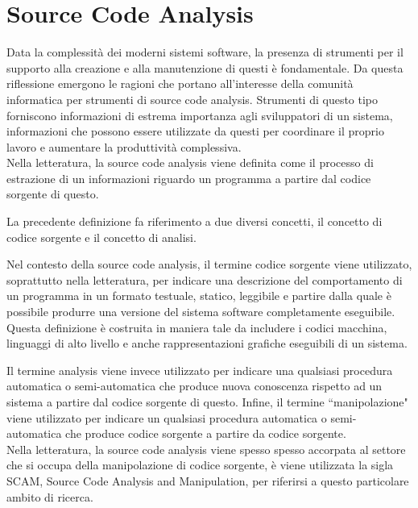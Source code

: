 \section{Source Code Analysis}
\label{source-code-analysis}

Data la complessità dei moderni sistemi software, la presenza di strumenti per
il supporto alla creazione e alla manutenzione di questi è fondamentale. Da
questa riflessione emergono le ragioni che portano all’interesse della comunità
informatica per strumenti di source code analysis. Strumenti di questo tipo
forniscono informazioni di estrema importanza agli sviluppatori di un sistema,
informazioni che possono essere utilizzate da questi per coordinare il proprio
lavoro e aumentare la produttività complessiva.\\

Nella letteratura, la source code analysis viene definita come il processo di
estrazione di un informazioni riguardo un programma a partire dal codice
sorgente di questo.

La precedente definizione fa riferimento a due diversi concetti, il concetto di
codice sorgente e il concetto di analisi.

Nel contesto della source code analysis, il termine codice sorgente viene
utilizzato, soprattutto nella letteratura, per indicare una descrizione del
comportamento di un programma in un formato testuale, statico, leggibile e
partire dalla quale è possibile produrre una versione del sistema software
completamente eseguibile. Questa definizione è costruita in maniera tale da
includere i codici macchina, linguaggi di alto livello e anche rappresentazioni
grafiche eseguibili di un sistema.

Il termine analysis viene invece utilizzato per indicare una qualsiasi procedura
automatica o semi-automatica che produce nuova conoscenza rispetto ad un sistema
a partire dal codice sorgente di questo. Infine, il termine “manipolazione"
viene utilizzato per indicare un qualsiasi procedura automatica o semi-
automatica che produce codice sorgente a partire da codice sorgente.
\cite{DBLP:journals/jss/DeanHKV06} \cite{DBLP:conf/icse/Binkley07}\\

Nella letteratura, la source code analysis viene spesso spesso accorpata al
settore che si occupa della manipolazione di codice sorgente, è viene utilizzata
la sigla SCAM, Source Code Analysis and Manipulation, per riferirsi a questo
particolare ambito di ricerca. \cite{DBLP:conf/scam/2001}\\

